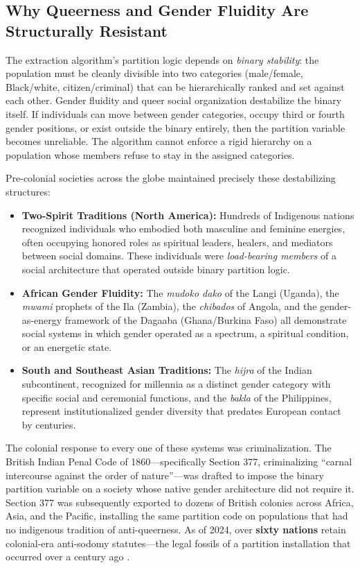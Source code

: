 \subsection{Why Queerness and Gender Fluidity Are Structurally Resistant}

The extraction algorithm's partition logic depends on \textit{binary stability}: the population must be cleanly divisible into two categories (male/female, Black/white, citizen/criminal) that can be hierarchically ranked and set against each other. Gender fluidity and queer social organization destabilize the binary itself. If individuals can move between gender categories, occupy third or fourth gender positions, or exist outside the binary entirely, then the partition variable becomes unreliable. The algorithm cannot enforce a rigid hierarchy on a population whose members refuse to stay in the assigned categories.

Pre-colonial societies across the globe maintained precisely these destabilizing structures:

\begin{itemize}
    \item \textbf{Two-Spirit Traditions (North America):} Hundreds of Indigenous nations recognized individuals who embodied both masculine and feminine energies, often occupying honored roles as spiritual leaders, healers, and mediators between social domains. These individuals were \textit{load-bearing members} of a social architecture that operated outside binary partition logic.

    \item \textbf{African Gender Fluidity:} The \textit{mudoko dako} of the Langi (Uganda), the \textit{mwami} prophets of the Ila (Zambia), the \textit{chibados} of Angola, and the gender-as-energy framework of the Dagaaba (Ghana/Burkina Faso) all demonstrate social systems in which gender operated as a spectrum, a spiritual condition, or an energetic state.

    \item \textbf{South and Southeast Asian Traditions:} The \textit{hijra} of the Indian subcontinent, recognized for millennia as a distinct gender category with specific social and ceremonial functions, and the \textit{bakla} of the Philippines, represent institutionalized gender diversity that predates European contact by centuries.
\end{itemize}

The colonial response to every one of these systems was criminalization. The British Indian Penal Code of 1860---specifically Section 377, criminalizing ``carnal intercourse against the order of nature''---was drafted to impose the binary partition variable on a society whose native gender architecture did not require it. Section 377 was subsequently exported to dozens of British colonies across Africa, Asia, and the Pacific, installing the same partition code on populations that had no indigenous tradition of anti-queerness. As of 2024, over \textbf{sixty nations} retain colonial-era anti-sodomy statutes---the legal fossils of a partition installation that occurred over a century ago \cite{hrw_alien_legacy}.

